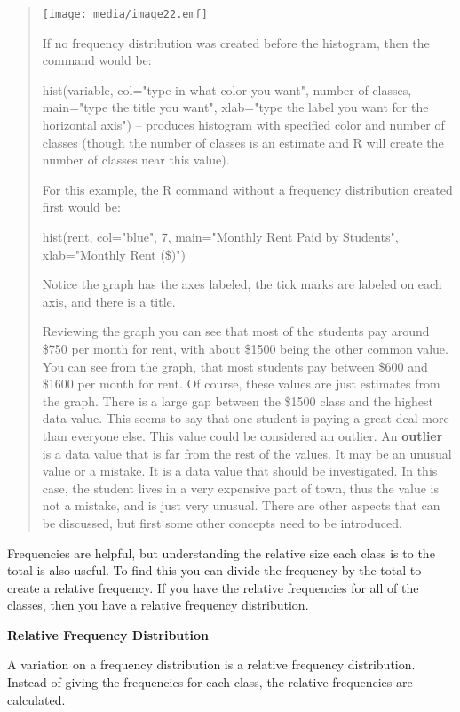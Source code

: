 \documentclass[]{book}
\begin{document}
\begin{quote}
\texttt{[image: media/image22.emf]}

If no frequency distribution was created before the histogram, then
the command would be:

hist(variable, col="type in what color you want", number of classes,
main="type the title you want", xlab="type the label you want for
the horizontal axis") -- produces histogram with specified color and
number of classes (though the number of classes is an estimate and R
will create the number of classes near this value).

For this example, the R command without a frequency distribution
created first would be:

hist(rent, col="blue", 7, main="Monthly Rent Paid by Students",
xlab="Monthly Rent (\$)")

Notice the graph has the axes labeled, the tick marks are labeled on
each axis, and there is a title.

Reviewing the graph you can see that most of the students pay around
\$750 per month for rent, with about \$1500 being the other common
value. You can see from the graph, that most students pay between
\$600 and \$1600 per month for rent. Of course, these values are just
estimates from the graph. There is a large gap between the \$1500
class and the highest data value. This seems to say that one student
is paying a great deal more than everyone else. This value could be
considered an outlier. An \textbf{outlier} is a data value that is far from
the rest of the values. It may be an unusual value or a mistake. It is
a data value that should be investigated. In this case, the student
lives in a very expensive part of town, thus the value is not a
mistake, and is just very unusual. There are other aspects that can be
discussed, but first some other concepts need to be introduced.
\end{quote}

Frequencies are helpful, but understanding the relative size each class
is to the total is also useful. To find this you can divide the
frequency by the total to create a relative frequency. If you have the
relative frequencies for all of the classes, then you have a relative
frequency distribution.

\textbf{Relative Frequency Distribution }

A variation on a frequency distribution is a relative frequency
distribution. Instead of giving the frequencies for each class, the
relative frequencies are calculated.
\end{document}
